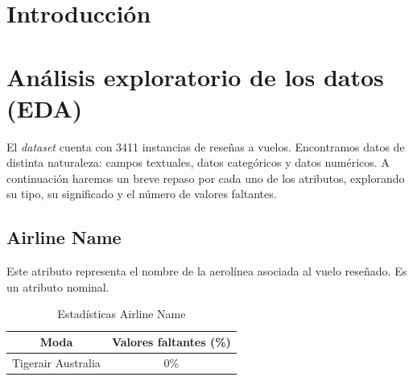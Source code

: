 \documentclass[12pt]{report} %
\begin{document}
\newpage %
\thispagestyle{empty}
\mbox{}


\tableofcontents
\thispagestyle{fancy}

\newpage %
\thispagestyle{empty}
\mbox{}

 \listoffigures
 \thispagestyle{fancy}

 \newpage %
 \thispagestyle{empty}
 \mbox{}

\listoftables
 \thispagestyle{fancy}

 \newpage %
 \thispagestyle{empty}
 \mbox{}


\clearpage
{} %

\chapter{Introducción}
\label{chap:intro}

\chapter{Análisis exploratorio de los datos (EDA)}
\label{chap:eda}
El \textit{dataset} cuenta con 3411 instancias de reseñas a vuelos. Encontramos datos de distinta naturaleza: campos textuales, datos categóricos y datos numéricos. A continuación haremos un breve repaso por cada uno de los atributos, explorando su tipo, su significado y el número de valores faltantes.

    \section{Airline Name}

    Este atributo representa el nombre de la aerolínea asociada al vuelo reseñado.
    Es un atributo nominal.

    \begin{table}[H]
        \begin{center}
            \begin{tabular}{ @{}cc@{} }
                \toprule
                Moda & Valores faltantes (\%) \\
                \midrule
                Tigerair Australia & 0\% \\
                \bottomrule
            \end{tabular}
            \caption{Estadísticas Airline Name}
        \end{center}
    \end{table}
\end{document}
